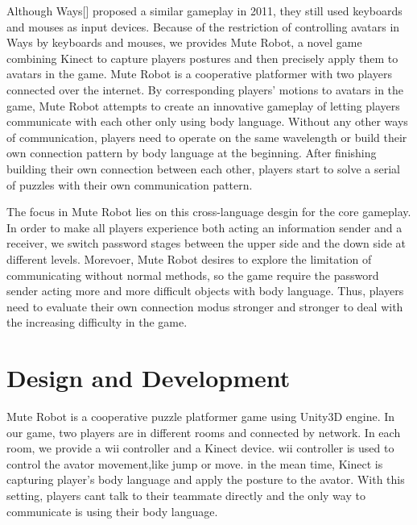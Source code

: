 \documentclass{chi-ext}
\begin{document}
Although Ways[] proposed a similar gameplay in 2011, they still used keyboards and mouses as input devices.
Because of the restriction of controlling avatars in Ways by keyboards and mouses, we provides Mute Robot, a novel game combining Kinect to capture players postures and then precisely apply them to avatars in the game.
Mute Robot is a cooperative platformer with two players connected over the internet.
By corresponding players' motions to avatars in the game, Mute Robot attempts to create an innovative gameplay of letting players communicate with each other only using body language.
Without any other ways of communication, players need to operate on the same wavelength or build their own connection pattern by body language at the beginning.
After finishing building their own connection between each other, players start to solve a serial of puzzles with their own communication pattern.

The focus in Mute Robot lies on this cross-language desgin for the core gameplay.
In order to make all players experience both acting an information sender and a receiver, we switch password stages between the upper side and the down side at different levels.
Morevoer, Mute Robot desires to explore the limitation of communicating without normal methods, so the game require the password sender acting more and more difficult objects with body language.
Thus, players need to evaluate their own connection modus stronger and stronger to deal with the increasing difficulty in the game. 

 
  
\section{Design and Development}
Mute Robot is a cooperative puzzle platformer game using Unity3D engine\cite{Unity3D}. In our game, two players are in different rooms and connected by network. In each room, we provide a wii controller and a Kinect\cite{Kinect} device. wii\cite{Wii} controller is used to control the avator movement,like jump or move. in the mean time, Kinect is capturing player’s body language and apply the posture to the avator. With this setting, players cant talk to their teammate directly and the only way to communicate is using  their body language.
\end{document}
